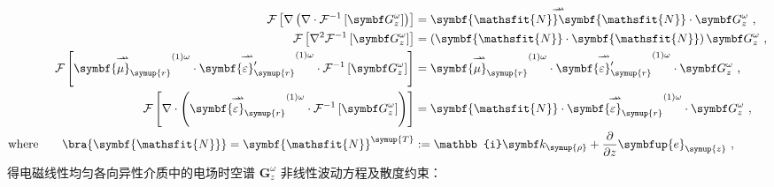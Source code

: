 \begin{subequations} \label{eq:2-20}
\begin{align}
	\mathcal F \left[ \nabla \left( \nabla \cdot \mathcal F^{-1} \left[ \symbf G^{\omega}_z \right] \right) \right] &= \overset{\rightharpoonup\!\!\!\! \rightharpoonup}{\symbf{\mathsfit{N}} \symbf{\mathsfit{N}}} \cdot \symbf G^{\omega}_z ~, \label{eq:2-20a}\\ \mathcal F \left[ \nabla^2 \mathcal F^{-1} \left[ \symbf G^{\omega}_z \right] \right] &= \left( \symbf{\mathsfit{N}} \cdot \symbf{\mathsfit{N}} \right) \symbf G^{\omega}_z ~, \label{eq:2-20b}\\ \mathcal F \left[ \overset{\rightharpoonup\!\!\!\! \rightharpoonup}{\symbf{\mu}_{\symup{r}}}^{(1)\omega} \cdot \overset{\rightharpoonup\!\!\!\! \rightharpoonup}{\symbf{\varepsilon}'_{\symup{r}}}^{(1)\omega} \cdot \mathcal F^{-1} \left[ \symbf G^{\omega}_z \right] \right] &= \overset{\rightharpoonup\!\!\!\! \rightharpoonup}{\symbf{\mu}_{\symup{r}}}^{(1)\omega} \cdot \overset{\rightharpoonup\!\!\!\! \rightharpoonup}{\symbf{\varepsilon}'_{\symup{r}}}^{(1)\omega} \cdot \symbf G^{\omega}_z ~, \label{eq:2-20c}\\ \mathcal F \left[ \nabla \cdot \left( \overset{\rightharpoonup\!\!\!\! \rightharpoonup}{\symbf{\varepsilon}_{\symup{r}}}^{(1)\omega} \cdot \mathcal F^{-1} \left[ \symbf G^{\omega}_z \right] \right) \right] &= \symbf{\mathsfit{N}} \cdot \overset{\rightharpoonup\!\!\!\! \rightharpoonup}{\symbf{\varepsilon}_{\symup{r}}}^{(1)\omega} \cdot \symbf G^{\omega}_z ~, \label{eq:2-20d} \\
	\text{where}\ \ \ \ \ \ \bra{\symbf{\mathsfit{N}}} = \symbf{\mathsfit{N}}^{\symup{T}} &:= \mathbb{i} \symbf k_{\symup{\rho}} + \frac{ \partial }{ \partial z } \symbfup{e}_{\symup{z}} ~, \label{eq:2-20e}
\end{align}
\end{subequations}
得电磁线性均匀各向异性介质中的电场时空谱 $\symbf G^{\omega}_z$ 非线性波动方程及散度约束：
